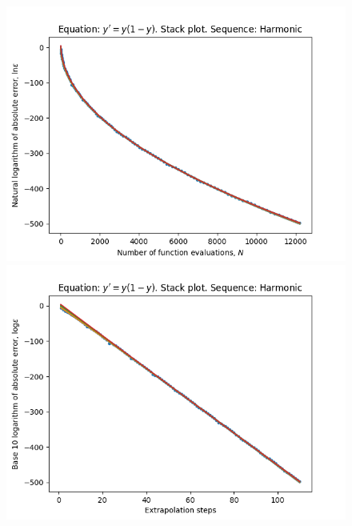\begin{figure}[H]
\centering
\begin{minipage}{0.45\textwidth}
\centering
\includegraphics[scale=0.45]{emr_plots/logistic_hp_harmonic_stack.png}
\end{minipage}
\begin{minipage}{0.45\textwidth}
\centering
\includegraphics[scale=0.45]{emr_plots/logistic_hp_harmonic_steps_stack.png}
\end{minipage}
\end{figure}

